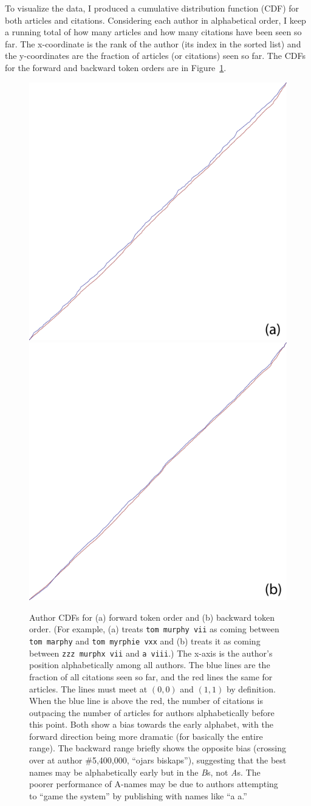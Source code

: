\documentclass[twocolumn]{article}
\begin{document}
To visualize the data, I produced a cumulative distribution function
(CDF) for both articles and citations. Considering each author in
alphabetical order, I keep a running total of how many articles and
how many citations have been seen so far. The x-coordinate is the rank
of the author (its index in the sorted list) and the y-coordinates are
the fraction of articles (or citations) seen so far. The CDFs for the
forward and backward token orders are in Figure~\ref{fig:authorcdf}.

\begin{figure}
  \begin{center}
  \includegraphics[width=0.44 \textwidth]{authorstats-forward}
  \includegraphics[width=0.44 \textwidth]{authorstats-backward}
  \end{center}
  \caption{ Author CDFs for (a) forward token order and (b) backward
    token order. (For example, (a) treats {\tt tom murphy vii} as
    coming between {\tt tom marphy} and {\tt tom myrphie vxx} and (b)
    treats it as coming between {\tt zzz murphx vii} and {\tt a
      viii}.) The x-axis is the author's position alphabetically among
    all authors. The blue lines are the fraction of all citations seen
    so far, and the red lines the same for articles. The lines must
    meet at $(0,0)$ and $(1,1)$ by definition. When the blue line is
    above the red, the number of citations is outpacing the number of
    articles for authors alphabetically before this point. Both show a
    bias towards the early alphabet, with the forward direction being
    more dramatic (for basically the entire range). The backward range
    briefly shows the opposite bias (crossing over at author
    \#5,400,000, ``ojars biskaps''), suggesting that the best names
    may be alphabetically early but in the {\em B}s, not {\em A}s. The
    poorer performance of A-names may be due to authors attempting to
    ``game the system'' by publishing with names like ``a a.''
  } \label{fig:authorcdf}
\end{figure}
\end{document}
